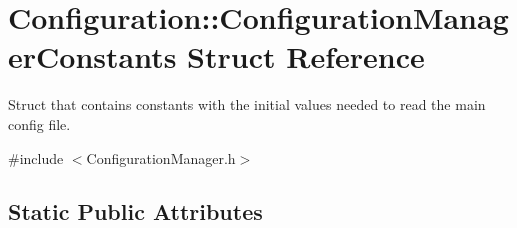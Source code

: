 \hypertarget{struct_configuration_1_1_configuration_manager_constants}{}\section{Configuration\+::Configuration\+Manager\+Constants Struct Reference}
\label{struct_configuration_1_1_configuration_manager_constants}


Struct that contains constants with the initial values needed to read the main config file.  




{\ttfamily \#include $<$Configuration\+Manager.\+h$>$}

\subsection*{Static Public Attributes}
